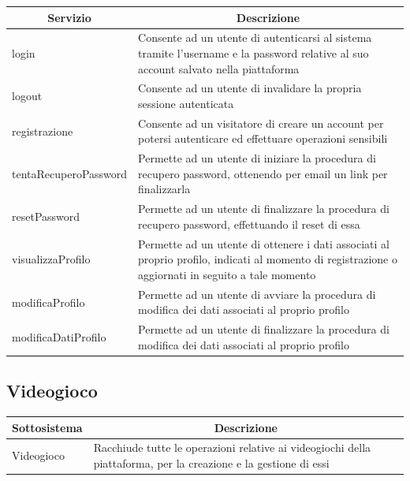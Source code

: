 \begin{center}
	\begin{tabular}{||l | p{22em}||} 
	\hline
	\multicolumn{1}{||c|}{\textbf{Servizio}} & \multicolumn{1}{c||}{\textbf{Descrizione}} \\
	\hline\hline
	login & Consente ad un utente di autenticarsi al sistema tramite l’username e la password relative al suo account salvato nella piattaforma \\ 
	\hline
	logout & Consente ad un utente di invalidare la propria sessione autenticata \\
	\hline
	registrazione & Consente ad un visitatore di creare un account per potersi autenticare ed effettuare operazioni sensibili \\
	\hline
	tentaRecuperoPassword & Permette ad un utente di iniziare la procedura di recupero password, ottenendo per email un link per finalizzarla \\
	\hline
	resetPassword & Permette ad un utente di finalizzare la procedura di recupero password, effettuando il reset di essa \\
	\hline
	visualizzaProfilo & Permette ad un utente di ottenere i dati associati al proprio profilo, indicati al momento di registrazione o aggiornati in seguito a tale momento \\
	\hline
	modificaProfilo & Permette ad un utente di avviare la procedura di modifica dei dati associati al proprio profilo \\
	\hline
	modificaDatiProfilo & Permette ad un utente di finalizzare la procedura di modifica dei dati associati al proprio profilo \\
	\hline
   \end{tabular}
\end{center}

\subsection{Videogioco}
\begin{center}
	\begin{tabular}{||l | p{22em}||} 
	\hline
	\multicolumn{1}{||c|}{\textbf{Sottosistema}} & \multicolumn{1}{c||}{\textbf{Descrizione}} \\
	\hline\hline
	Videogioco & Racchiude tutte le operazioni relative ai videogiochi della piattaforma, per la creazione e la gestione di essi \\ 
	\hline
   \end{tabular}
\end{center}

